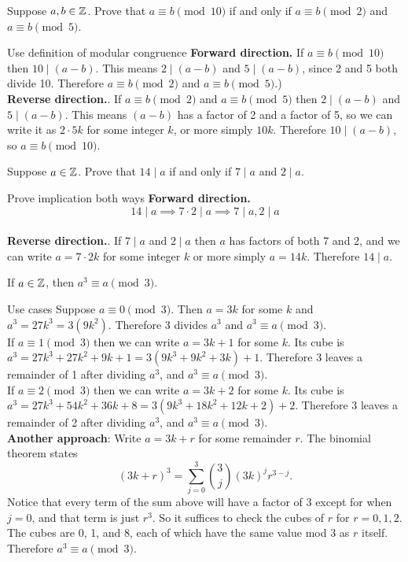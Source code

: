 \documentclass{article}
\begin{document}
\begin{problem}
Suppose $a, b \in \mathbb{Z}$. Prove that $a\equiv b \pmod{10}$ if and only if $a \equiv b \pmod{2}$ and $a \equiv b \pmod{5}$.
\end{problem}
\begin{solution}{Use definition of modular congruence}
  \textbf{Forward direction.} If $a \equiv b \pmod{10}$ then $10 \mid (a - b)$. This means $2 \mid (a - b)$ and $5 \mid (a - b)$, since 2 and 5 both divide 10. Therefore $a \equiv b \pmod{2}$ and $a \equiv b \pmod{5}$.)
  \\
  \textbf{Reverse direction.}. If $a \equiv b \pmod{2}$ and $a \equiv b \pmod{5}$ then $2 \mid (a - b)$ and $5 \mid (a - b)$. This means $(a-b)$ has a factor of 2 and a factor of 5, so we can write it as $2\cdot5k$ for some integer $k$, or more simply $10k$. Therefore $10 \mid (a - b)$, so $a \equiv b \pmod{10}$.
\end{solution}
\begin{problem}
Suppose $a \in \mathbb{Z}$. Prove that $14 \mid a$ if and only if $7 \mid a$ and $2 \mid a$.
\end{problem}
\begin{solution}{Prove implication both ways}
  \textbf{Forward direction.}
  $$ 14 \mid a \implies 7\cdot 2 \mid a \implies 7 \mid a, 2 \mid a$$
  \\
  \textbf{Reverse direction.}. If $7 \mid a$ and $2 \mid a$ then $a$ has factors of both 7 and 2, and we can write $a = 7\cdot 2k$ for some integer $k$ or more simply $a = 14k$. Therefore $14 \mid a$.
\end{solution}

\begin{problem}
If $a \in \mathbb{Z}$, then $a^3 \equiv a \pmod{3}$.
\end{problem}
\begin{solution}{Use cases}
  Suppose $a \equiv 0 \pmod{3}$. Then $a = 3k$ for some $k$ and $a^3 = 27k^3 = 3(9k^2)$. Therefore 3 divides $a^3$ and $a^3 \equiv a \pmod{3}$.
  \\
  If $a\equiv 1 \pmod{3}$ then we can write $a = 3k + 1$ for some $k$. Its cube is $a^3 = 27k^3 + 27k^2 + 9k + 1 = 3(9k^3 + 9k^2 + 3k) + 1$. Therefore 3 leaves a remainder of 1 after dividing $a^3$, and $a^3 \equiv a \pmod{3}$.
  \\
  If $a\equiv 2 \pmod{3}$ then we can write $a = 3k + 2$ for some $k$. Its cube is $a^3 = 27k^3 + 54k^2 + 36k + 8 = 3(9k^3 + 18k^2 + 12k + 2) + 2$. Therefore 3 leaves a remainder of 2 after dividing $a^3$, and $a^3 \equiv a \pmod{3}$.
  \\
  \textbf{Another approach}: Write $a = 3k + r$ for some remainder $r$. The binomial theorem states
  $$(3k + r)^3 = \sum_{j=0}^3 \binom{3}{j}(3k)^j r^{3-j}.$$
  Notice that every term of the sum above will have a factor of 3 except for when $j = 0$, and that term is just $r^3$. So it suffices to check the cubes of $r$ for $r = 0, 1, 2$. The cubes are 0, 1, and 8, each of which have the same value mod 3 as $r$ itself. Therefore $a^3 \equiv a \pmod{3}$.
\end{solution}
\end{document}
